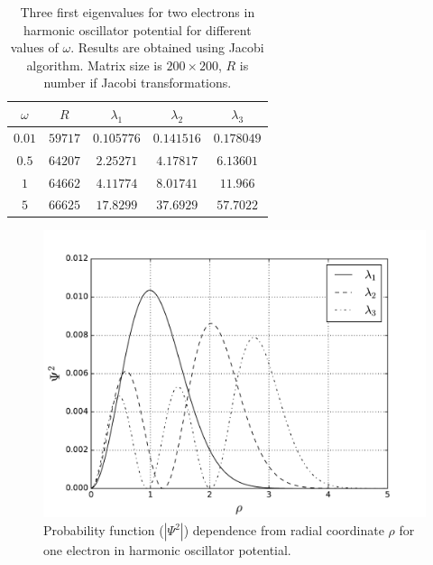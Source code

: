 \documentclass[10pt]{article}
\begin{document}
\begin{table}[h!]
  \caption{Three first eigenvalues for two electrons in harmonic oscillator potential for different values of $\omega$. Results are obtained using Jacobi algorithm. Matrix size is $200 \times 200$, $R$ is number if Jacobi transformations.}
  \label{tab:two}
	\begin{center}
    \begin{tabular}{c|c|c|c|c}
    \hline
		$\omega$ & $R$ & $\lambda_1$ & $\lambda_2$ & $\lambda_3$ \\
        \hline
		$0.01$ & $59717$ & $0.105776$ & $0.141516$  & $0.178049$ \\ 
		$0.5$  & $64207$ & $2.25271 $ & $4.17817 $  & $6.13601$ \\ 
		$1  $  & $64662$ & $4.11774 $ & $8.01741 $  & $11.966$ \\
		$5  $  & $66625$ & $17.8299 $ & $37.6929 $  & $57.7022$ \\

	\end{tabular}
  \end{center}
\end{table}




\begin{figure}
  \begin{center}
    \includegraphics[scale=0.7]{one_electron}
    \caption {Probability function ($|\Psi^{2}|$) dependence from radial coordinate $\rho $ for one electron in harmonic oscillator potential.}
    \label{fig:one_electron}
  \end{center}
\end{figure}
\end{document}
